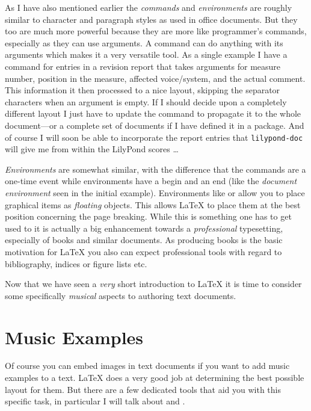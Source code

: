 \documentclass[DIV=12]{scrreprt}
\begin{document}
As I have also mentioned earlier the \emph{commands} and \emph{environments} are roughly similar to character and paragraph styles as used in office documents.
But they too are much more powerful because they are more like programmer's commands, especially as they can use arguments.
A command can do anything with its arguments which makes it a very versatile tool.
As a single example I have a command for entries in a revision report that takes arguments for measure number, position in the measure, affected voice/system, and the actual comment.
This information it then processed to a nice layout, skipping the separator characters when an argument is empty.
If I should decide upon a completely different layout I just have to update the command to propagate it to the whole document---or a complete set of documents if I have defined it in a package.
And of course I will soon be able to incorporate the report entries that \texttt{lilypond-doc} will give me from within the LilyPond scores \dots

\emph{Environments} are somewhat similar, with the difference that the commands are a one-time event while environments have a begin and an end (like the \emph{document environment} seen in the initial example).
Environments like  or  allow you to place graphical items as \emph{floating} objects.
This allows \LaTeX{} to place them at the best position concerning the page breaking.
While this is something one has to get used to it is actually a big enhancement towards a \emph{professional} typesetting, especially of books and similar documents.
As producing books is the basic motivation for \LaTeX{} you also can expect professional tools with regard to bibliography, indices or figure lists etc.

\medskip
Now that we have seen a \emph{very} short introduction to \LaTeX{} it is time to consider some specifically \emph{musical} aspects to authoring text documents.

\section{Music Examples}
\label{sec:pt_music-examples}
Of course you can embed images in text documents if you want to add music examples to a text.
\LaTeX{} does a very good job at determining the best possible layout for them.
But there are a few dedicated tools that aid you with this specific task, in particular I will talk about  and .
\end{document}
